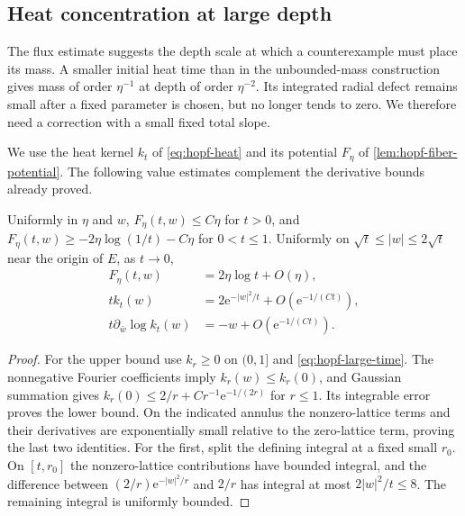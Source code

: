 \subsection{Heat concentration at large depth}

The flux estimate suggests the depth scale at which a counterexample must place its mass. A smaller initial heat time than in the unbounded-mass construction gives mass of order $\eta^{-1}$ at depth of order $\eta^{-2}$. Its integrated radial defect remains small after a fixed parameter is chosen, but no longer tends to zero. We therefore need a correction with a small fixed total slope.

We use the heat kernel $k_t$ of \eqref{eq:hopf-heat} and its potential $F_\eta$ of \cref{lem:hopf-fiber-potential}. The following value estimates complement the derivative bounds already proved.

\begin{lemma}\label{lem:rotational-heat-values}
Uniformly in $\eta$ and $w$,
$F_\eta(t,w)\leq C\eta$ for $t>0$, and
$F_\eta(t,w)\geq-2\eta\log(1/t)-C\eta$ for $0<t\leq1$.
Uniformly on $\sqrt t\leq|w|\leq2\sqrt t$ near the origin of $E$, as $t\to0$,
\begin{align*}
 F_\eta(t,w)&=2\eta\log t+O(\eta),\\
 t k_t(w)&=2\mathrm e^{-|w|^2/t}+O(\mathrm e^{-1/(Ct)}),\\
 t\partial_{\bar w}\log k_t(w)&=-w+O(\mathrm e^{-1/(Ct)}).
\end{align*}
\end{lemma}
\begin{proof}
For the upper bound use $k_r\geq0$ on $(0,1]$ and \eqref{eq:hopf-large-time}.
The nonnegative Fourier coefficients imply $k_r(w)\leq k_r(0)$, and Gaussian
summation gives
$k_r(0)\leq2/r+C r^{-1}\mathrm e^{-1/(2r)}$ for $r\leq1$.
Its integrable error proves the lower bound.
On the indicated annulus the nonzero-lattice terms and their derivatives
are exponentially small relative to the zero-lattice term, proving the last
two identities. For the first, split the defining integral at a fixed small
$r_0$. On $[t,r_0]$ the nonzero-lattice contributions have bounded integral,
and the difference between $(2/r)\mathrm e^{-|w|^2/r}$ and $2/r$ has integral
at most $2|w|^2/t\leq8$. The remaining integral is uniformly bounded.
\end{proof}

